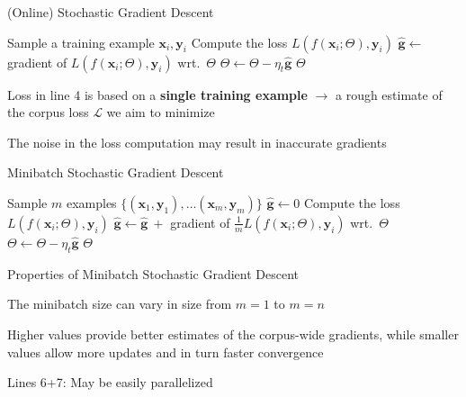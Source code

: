 \documentclass[12pt,aspectratio=169,handout]{beamer}
\begin{document}
\begin{frame}{(Online) Stochastic Gradient Descent}

\begin{algorithmic}[1]
		\State Sample a training example $\bm{x}_i, \bm{y}_i$
		\State Compute the loss $L(f(\bm{x}_i; \Theta), \bm{y}_i)$
		\State $\hat{\bm{g}} \gets$ gradient of $L(f(\bm{x}_i; \Theta), \bm{y}_i)$ wrt.\ $\Theta$
		\State $\Theta \gets \Theta - \eta_t \hat{\bm{g}}$
	\EndWhile
	\State \Return $\Theta$
	\EndFunction
\end{algorithmic}

Loss in line 4 is based on a \textbf{single training example} $\to$ a rough estimate of the corpus loss $\mathcal{L}$ we aim to minimize

The noise in the loss computation may result in inaccurate gradients

\end{frame}



\begin{frame}{Minibatch Stochastic Gradient Descent}
	
	\begin{algorithmic}[1]
		\State Sample $m$ examples $\{ (\bm{x}_1, \bm{y}_1), \ldots (\bm{x}_m, \bm{y}_m) \}$
		\State $\hat{\bm{g}} \gets 0$
			\State Compute the loss $L(f(\bm{x}_i; \Theta), \bm{y}_i)$
			\State $\hat{\bm{g}} \gets \hat{\bm{g}}\ + $ gradient of $\frac{1}{m} L(f(\bm{x}_i; \Theta), \bm{y}_i)$ wrt.\ $\Theta$
		\EndFor
		\State $\Theta \gets \Theta - \eta_t \hat{\bm{g}}$
		\EndWhile
		\State \Return $\Theta$
		\EndFunction
	\end{algorithmic}
	

\end{frame}

\begin{frame}{Properties of Minibatch Stochastic Gradient Descent}

The minibatch size can vary in size from $m = 1$ to $m = n$

Higher values provide better estimates of the corpus-wide gradients, while smaller values allow more updates and in turn faster convergence

Lines 6+7: May be easily parallelized

\end{frame}
\end{document}

